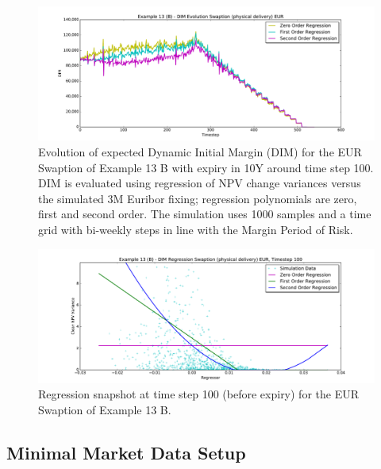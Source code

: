 \documentclass[12pt, a4paper]{article}
\begin{document}
{\begin{figure}[h!]
\begin{center}
\includegraphics[scale=0.45]{mpl_dim_evolution_B_swaption_eur.pdf}
\end{center}
\caption{Evolution of expected Dynamic Initial Margin (DIM) for the EUR Swaption of Example 13 B with expiry in 10Y
  around time step 100. DIM is evaluated using regression of NPV change variances versus the simulated 3M Euribor
  fixing; regression polynomials are zero, first and second order. The simulation uses 1000 samples and a time grid with
  bi-weekly steps in line with the Margin Period of Risk.}
\label{fig_ex13b_evolution}
\end{figure}

\begin{figure}[h!]
\begin{center}
\includegraphics[scale=0.45]{mpl_dim_regression_B_swaption_eur_t100.pdf}
\end{center}
\caption{Regression snapshot at time step 100 (before expiry) for the EUR Swaption of Example 13 B.}
\label{fig_ex13b_regression}
\end{figure}

\subsection{Minimal Market Data Setup}

}
\end{document}
